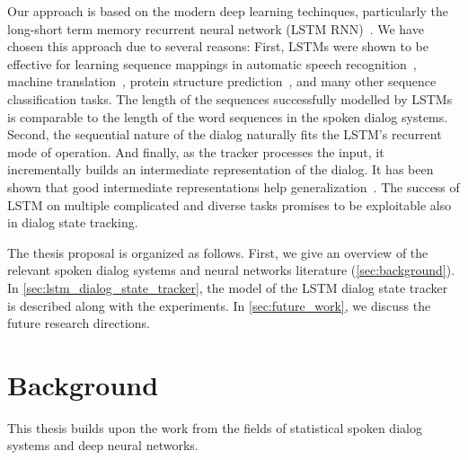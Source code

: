 \documentclass[runningheads,a4paper]{llncs}
\begin{document}
Our approach is based on the modern deep learning techinques, particularly the long-short term memory recurrent neural network (LSTM RNN)~\cite{hochreiter1997long}.
We have chosen this approach due to several reasons:
First, LSTMs were shown to be effective for learning sequence mappings in automatic speech recognition~\cite{graves2005framewise}, machine translation~\cite{sutskever2014sequence}, protein structure prediction~\cite{sonderby2014protein}, and many other sequence classification tasks. The length of the sequences successfully modelled by LSTMs is comparable to the length of the word sequences in the spoken dialog systems.
Second, the sequential nature of the dialog naturally fits the LSTM's recurrent mode of operation. And finally, as the tracker processes the input, it incrementally builds an intermediate representation of the dialog. It has been shown that good intermediate representations help generalization~\cite{gulccehre2013knowledge}.
The success of LSTM on multiple complicated and diverse tasks promises to be exploitable also in dialog state tracking.


The thesis proposal is organized as follows. First, we give an overview of the relevant spoken dialog systems and neural networks literature (\autoref{sec:background}). In \autoref{sec:lstm_dialog_state_tracker}, the model of the LSTM dialog state tracker is described along with the experiments. In \autoref{sec:future_work}, we discuss the future research directions.


\section{Background}
\label{sec:background}
This thesis builds upon the work from the fields of statistical spoken dialog systems and deep neural networks.
\end{document}
